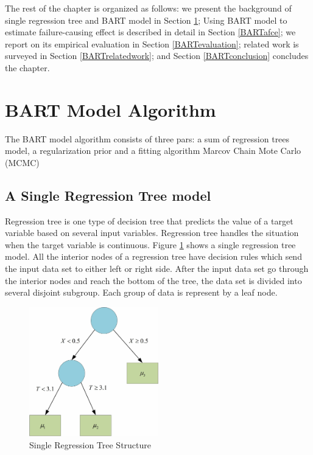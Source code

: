 The rest of the chapter is organized as follows: we present the background of single regression tree and BART model in Section \ref{BARTbg}; Using BART model to estimate failure-causing effect is described in detail in Section \ref{BARTafce};  we report on its empirical evaluation in Section \ref{BARTevaluation}; related work is surveyed in Section \ref{BARTrelatedwork}; and Section \ref{BARTconclusion} concludes the chapter.

\section{BART Model Algorithm}\label{BARTbg}%
The BART model algorithm consists of three pars: a sum of regression trees model, a regularization prior and a fitting algorithm Marcov Chain Mote Carlo (MCMC)
\subsection{A Single Regression Tree model}\label{IIIA}
Regression tree is one type of decision tree that predicts the value of a target variable based on several input variables. Regression tree handles the situation when the target variable is continuous. Figure \ref{singlergt} shows a single regression tree model. All the interior nodes of a regression tree have decision rules which send the input data set to either left or right side. After the input data set go through the interior nodes and reach the bottom of the tree, the data set is divided into several disjoint subgroup. Each group of data is represent by a leaf node.

\begin{figure}[!thpb]
\centering
\includegraphics[width=0.5\textwidth]{chapter4_SingleRGT.pdf}
\caption{Single Regression Tree Structure}
\label{singlergt}
\end{figure}

